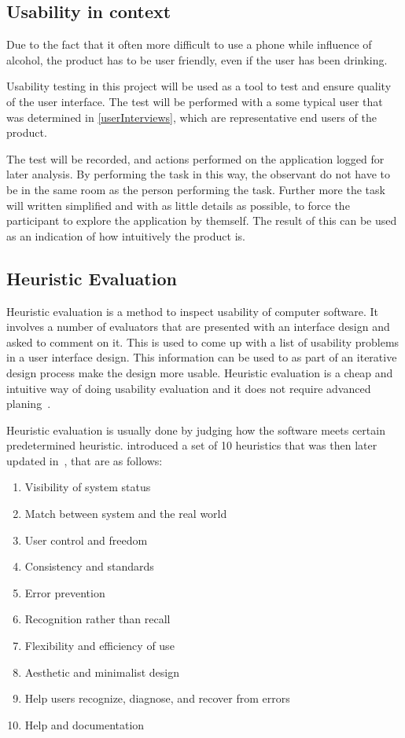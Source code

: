 
\subsection{Usability in context}
\label{sub:usability_in_context}

Due to the fact that it often more difficult to use a phone while influence of alcohol, the product has to be user friendly, even if the user has been drinking.

Usability testing in this project will be used as a tool to test and ensure quality of the user interface. The test will be performed with a some typical user that was determined in \cref{userInterviews}, which are representative end users of the product.

The test will be recorded, and actions performed on the application logged for later analysis. By performing the task in this way, the observant do not have to be in the same room as the person performing the task. Further more the task will written simplified and with as little details as possible, to force the participant to explore the application by themself. The result of this can be used as an indication of how intuitively the product is.

\subsection{Heuristic Evaluation}
Heuristic evaluation is a method to inspect usability of computer software. It involves a number of evaluators that are presented with an interface design and asked to comment on it. This is used to come up with a list of usability problems in a user interface design. This information can be used to as part of an iterative design process make the design more usable. Heuristic evaluation is a cheap and intuitive way of doing usability evaluation and it does not require advanced planing~\cite{Nielsen1990}.

Heuristic evaluation is usually done by judging how the software meets certain predetermined heuristic. \cite{Nielsen1990} introduced a set of 10 heuristics that was then later updated in~\cite{Nielsen1994}, that are as follows:

\begin{enumerate}
  \item Visibility of system status
  \item Match between system and the real world
  \item User control and freedom
  \item Consistency and standards
  \item Error prevention
  \item Recognition rather than recall
  \item Flexibility and efficiency of use
  \item Aesthetic and minimalist design
  \item Help users recognize, diagnose, and recover from errors
  \item Help and documentation
\end{enumerate}

